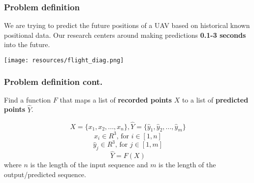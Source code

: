 \documentclass{beamer}
\begin{document}
\begin{frame}
    \frametitle{Problem definition}

    We are trying to predict the future positions of a UAV based on historical
    known positional data. Our research centers around making predictions 
    \textbf{0.1-3 seconds} into the future.

    \centering
    \texttt{[image: resources/flight\_diag.png]}
\end{frame}


\begin{frame}
    \frametitle{Problem definition cont.}
    Find a function $F$ that maps a list of \textbf{recorded points} $X$ to a list 
    of \textbf{predicted points} $\hat{Y}$.

    $$ X = \{x_1, x_2, ..., x_n\}, \hat{Y} = \{\hat{y}_1, \hat{y}_2, ..., \hat{y}_m\} $$ 
    $$ x_i \in R^3 \text{, for } i \in [1, n]$$
    $$\hat{y}_j \in R^3 \text{, for } j \in [1, m]$$
    $$ \hat{Y} = F(X) $$
    where $n$ is the length of the input sequence and $m$ is the length of the 
    output/predicted sequence.
\end{frame}
\end{document}
